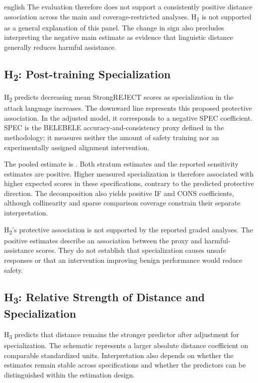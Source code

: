 \begin{otherlanguage*}{english}
The evaluation therefore does not support a consistently positive distance association across the main and coverage-restricted analyses. H\textsubscript{1} is not supported as a general explanation of this panel. The change in sign also precludes interpreting the negative main estimate as evidence that linguistic distance generally reduces harmful assistance.

\subsection{H\textsubscript{2}: Post-training Specialization}

H\textsubscript{2} predicts decreasing mean StrongREJECT scores as specialization in the attack language increases. The downward line represents this proposed protective association. In the adjusted model, it corresponds to a negative SPEC coefficient. SPEC is the BELEBELE accuracy-and-consistency proxy defined in the methodology; it measures neither the amount of safety training nor an experimentally assigned alignment intervention.

The pooled estimate is \GSpecInterval{}. Both stratum estimates and the reported sensitivity estimates are positive. Higher measured specialization is therefore associated with higher expected scores in these specifications, contrary to the predicted protective direction. The decomposition also yields positive IF and CONS coefficients, although collinearity and sparse comparison coverage constrain their separate interpretation.

H\textsubscript{2}'s protective association is not supported by the reported graded analyses. The positive estimates describe an association between the proxy and harmful-assistance scores. They do not establish that specialization causes unsafe responses or that an intervention improving benign performance would reduce safety.

\subsection{H\textsubscript{3}: Relative Strength of Distance and Specialization}

H\textsubscript{3} predicts that distance remains the stronger predictor after adjustment for specialization. The schematic represents a larger absolute distance coefficient on comparable standardized units. Interpretation also depends on whether the estimates remain stable across specifications and whether the predictors can be distinguished within the estimation design.


\end{otherlanguage*}
